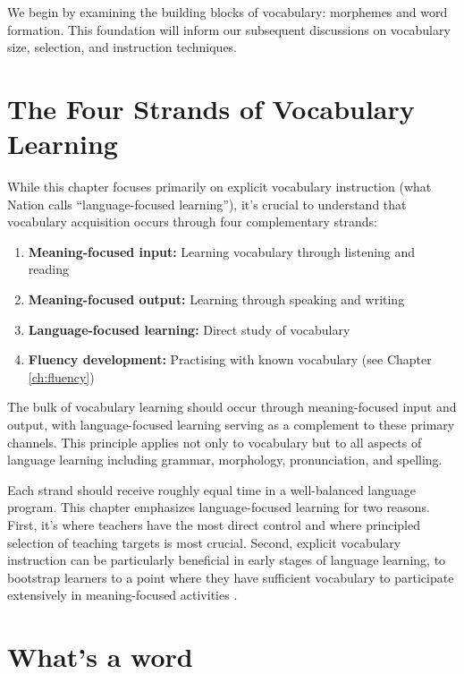 We begin by examining the building blocks of vocabulary: morphemes and word formation. This foundation will inform our subsequent discussions on vocabulary size, selection, and instruction techniques.

\section{The Four Strands of Vocabulary Learning} \label{sec:four-strands}

While this chapter focuses primarily on explicit vocabulary instruction (what Nation calls ``language-focused learning''), it's crucial to understand that vocabulary acquisition occurs through four complementary strands:

\begin{enumerate}
    \item \textbf{Meaning-focused input:} Learning vocabulary through listening and reading
    \item \textbf{Meaning-focused output:} Learning through speaking and writing
    \item \textbf{Language-focused learning:} Direct study of vocabulary
    \item \textbf{Fluency development:} Practising with known vocabulary (see Chapter \ref{ch:fluency})
\end{enumerate}

The bulk of vocabulary learning should occur through meaning-focused input and output, with language-focused learning serving as a complement to these primary channels. This principle applies not only to vocabulary but to all aspects of language learning including grammar, morphology, pronunciation, and spelling.

Each strand should receive roughly equal time in a well-balanced language program. This chapter emphasizes language-focused learning for two reasons. First, it's where teachers have the most direct control and where principled selection of teaching targets is most crucial. Second, explicit vocabulary instruction can be particularly beneficial in early stages of language learning, to bootstrap learners to a point where they have sufficient vocabulary to participate extensively in meaning-focused activities \citep{Nation2022}.

\section{What's a word}\label{sec:what-is-a-word}

